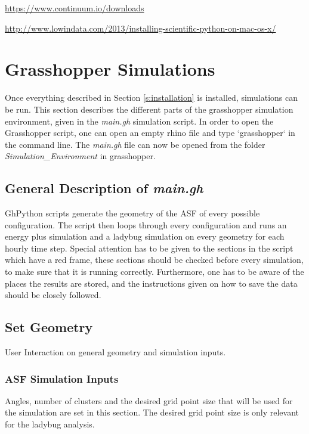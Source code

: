 	\url{https://www.continuum.io/downloads}\\


	\url{http://www.lowindata.com/2013/installing-scientific-python-on-mac-os-x/}\\



\section{Grasshopper Simulations}

	
	Once everything described in Section \ref{s:installation} is installed, simulations can be run. This section describes the different parts of the grasshopper simulation environment, given in the \emph{main.gh} simulation script. In order to open the Grasshopper script, one can open an empty rhino file and type `grasshopper` in the command line. The \emph{main.gh} file can now be opened from the folder \emph{Simulation\_Environment} in grasshopper.



	\subsection{General Description of \emph{main.gh}}
		GhPython scripts generate the geometry of the ASF of every possible configuration. The script then loops through every configuration and runs an energy plus simulation and a ladybug simulation on every geometry for each hourly time step. Special attention has to be given to the sections in the script which have a red frame, these sections should be checked before every simulation, to make sure that it is running correctly. Furthermore, one has to be aware of the places the results are stored, and the instructions given on how to save the data should be closely followed. 



	\subsection{Set Geometry}
	User Interaction on general geometry and simulation inputs.

	\subsubsection{ASF Simulation Inputs}
	Angles, number of clusters and the desired grid point size that will be used for the simulation are set in this section. The desired grid point size is only relevant for the ladybug analysis.

